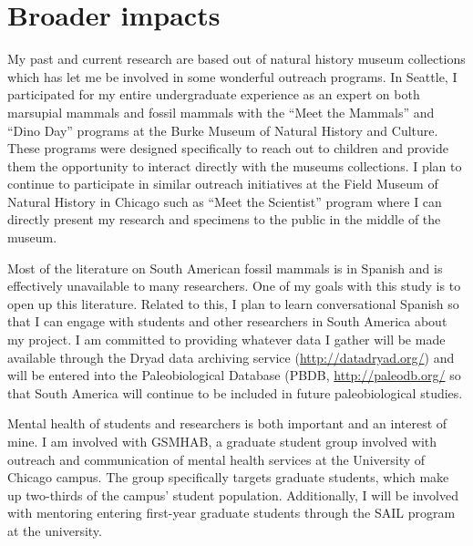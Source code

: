 \documentclass[11pt,letterpaper]{article}
\begin{document}
\section{Broader impacts}

My past and current research are based out of natural history museum collections which has let me be involved in some wonderful outreach programs. In Seattle, I participated for my entire undergraduate experience as an expert on both marsupial mammals and fossil mammals with the ``Meet the Mammals'' and ``Dino Day'' programs at the Burke Museum of Natural History and Culture. These programs were designed specifically to reach out to children and provide them the opportunity to interact directly with the museums collections. I plan to continue to participate in similar outreach initiatives at the Field Museum of Natural History in Chicago such as ``Meet the Scientist'' program where I can directly present my research and specimens to the public in the middle of the museum.

Most of the literature on South American fossil mammals is in Spanish and is effectively unavailable to many researchers. One of my goals with this study is to open up this literature. Related to this, I plan to learn conversational Spanish so that I can engage with students and other researchers in South America about my project. I am committed to providing whatever data I gather will be made available through the Dryad data archiving service (\url{http://datadryad.org/}) and will be entered into the Paleobiological Database (PBDB, \url{http://paleodb.org/} so that South America will continue to be included in future paleobiological studies. 

Mental health of students and researchers is both important and an interest of mine. I am involved with GSMHAB, a graduate student group involved with outreach and communication of mental health services at the University of Chicago campus. The group specifically targets graduate students, which make up two-thirds of the campus' student population. Additionally, I will be involved with mentoring entering first-year graduate students through the SAIL program at the university.




\end{document}
